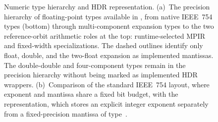 \begin{figure}[!htbp]
\begin{tikzpicture}
\end{tikzpicture}
\caption[Numeric type hierarchy and HDR representation]{%
  Numeric type hierarchy and HDR representation.
  (a)~The precision hierarchy of floating-point types available in
  \FractalShark{}, from native IEEE~754 types (bottom) through
  multi-component expansion types to the two reference-orbit arithmetic roles
  at the top: runtime-selected MPIR and fixed-width 
  specializations. The dashed outlines identify only float, double, and the
  two-float expansion as implemented  mantissas. The
  double-double and four-component types remain in the precision hierarchy
  without being marked as implemented HDR wrappers.
  (b)~Comparison of the standard IEEE~754  layout, where
  exponent and mantissa share a fixed bit budget, with the
   representation, which stores an explicit integer
  exponent separately from a fixed-precision mantissa of type~.}
\label{fig:type-hierarchy}
\end{figure}
